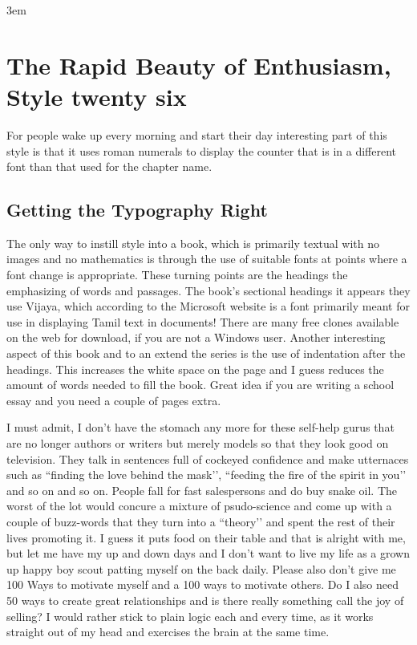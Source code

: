 \parindent3em

 
\chapter{The Rapid Beauty of Enthusiasm, Style twenty six}
\thispagestyle{plain}


{\huge F}or people wake up every morning and start their day  interesting part of this style is that it uses roman numerals to display the counter that is in a different font than that used for the chapter name.\par
\medskip
\begin{figure}[ht]
\centering
{}
\end{figure}

\lorem 

\section{Getting the Typography Right}

The only way to instill style into a book, which is primarily textual with no images and no mathematics is through the use of suitable fonts at points where a font change is appropriate. These turning points are the headings the emphasizing of words and passages.  The book’s sectional headings it appears they use Vijaya, which according to the Microsoft website is a font primarily meant for use in displaying Tamil text in documents! There are many free clones available on the web for download, if you are not a Windows user. Another interesting aspect of this book and to an extend the series is the use of indentation after the headings. This increases the white space on the page and I guess reduces the amount of words needed to fill the book. Great idea if you are writing a school essay and you need a couple of pages extra. 

I must admit, I don’t have the stomach any more for these self-help gurus that are no longer authors or writers  but merely models so that they look good on television. They talk in sentences full of cockeyed confidence and make utternaces such as ``finding the love behind the mask’’, ``feeding the fire of the spirit in you’’ and so on and so on.
People fall for fast salespersons and do buy snake oil. The worst of the lot would concure a mixture of psudo-science and come up with a couple of buzz-words that they turn into a ``theory’’ and spent the rest of their lives promoting it. I guess it puts food on their table and that is alright with me, but let me have my up and down days and I don’t want to live my life as a grown up happy boy scout patting myself on the back daily. Please also don’t give me 100 Ways to motivate myself and a 100 ways to motivate others. Do I also need 50 ways to create great relationships and is there really something call the joy of selling? I would rather stick to plain logic each and every time, as it works straight out of my head and exercises the brain at the same time.

